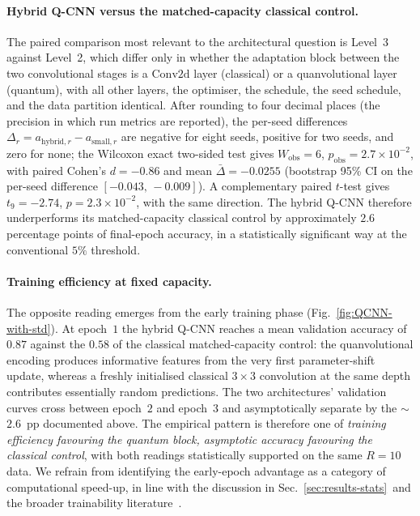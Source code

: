 \paragraph{Hybrid Q-CNN versus the matched-capacity classical control.}
The paired comparison most relevant to the architectural question is
Level~3 against Level~2, which differ only in whether the adaptation
block between the two convolutional stages is a $\mathrm{Conv2d}$ layer
(classical) or a quanvolutional layer (quantum), with all other layers,
the optimiser, the schedule, the seed schedule, and the data partition
identical. After rounding to four decimal places (the precision in which
run metrics are reported), the per-seed differences
$\Delta_{r}=a_{\mathrm{hybrid},r}-a_{\mathrm{small},r}$ are negative for
eight seeds, positive for two seeds, and zero for none; the Wilcoxon
exact two-sided test gives $W_{\mathrm{obs}}=6$,
$p_{\mathrm{obs}}=2.7\times 10^{-2}$, with paired Cohen's $d=-0.86$ and
mean $\bar{\Delta}=-0.0255$ (bootstrap 95\% CI on the per-seed difference
$[-0.043,\,-0.009]$). A complementary paired $t$-test gives
$t_{9}=-2.74$, $p=2.3\times 10^{-2}$, with the same direction. The
hybrid Q-CNN therefore underperforms its matched-capacity classical
control by approximately $2.6$ percentage points of final-epoch
accuracy, in a statistically significant way at the conventional
$5\%$ threshold.

\paragraph{Training efficiency at fixed capacity.}
The opposite reading emerges from the early training phase
(Fig.~\ref{fig:QCNN-with-std}). At epoch~$1$ the
hybrid Q-CNN reaches a mean validation accuracy of $0.87$ against the
$0.58$ of the classical matched-capacity control: the quanvolutional
encoding produces informative features from the very first parameter-shift
update, whereas a freshly initialised classical $3{\times}3$ convolution
at the same depth contributes essentially random predictions. The
two architectures' validation curves cross between epoch~$2$ and
epoch~$3$ and asymptotically separate by the $\sim$$2.6$~pp documented
above. The empirical pattern is therefore one of \emph{training
efficiency favouring the quantum block, asymptotic accuracy favouring
the classical control}, with both readings statistically supported on
the same $R=10$ data. We refrain from identifying the early-epoch
advantage as a category of computational speed-up, in line with the
discussion in Sec.~\ref{sec:results-stats}~and the broader trainability
literature~\cite{Pesah2021PRX,Cong2019,Havlicek2019}.

